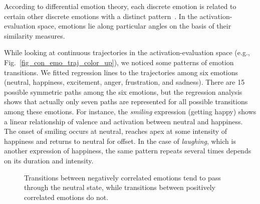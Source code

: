 \documentclass[10pt,journal,cspaper,compsoc]{IEEEtran}
\begin{document}
According to differential emotion theory, each discrete emotion is related to certain other discrete emotions with a distinct pattern~\cite{blumberg1991patterns}. In the activation-evaluation space, emotions lie along particular angles on the basis of their similarity measures.


While looking at  continuous trajectories in the activation-evaluation space (e.g., Fig.~\ref{fig_con_emo_traj_color_up}), we noticed some patterns of emotion transitions. We fitted regression lines to the trajectories among six emotions (neutral, happiness, excitement, anger, frustration, and sadness). There are 15 possible symmetric paths among the six emotions, but the regression analysis shows that actually only seven paths are represented for all possible transitions among these emotions. For instance, the \emph{smiling} expression (getting happy) shows a linear relationship of valence and activation between neutral and happiness. The onset of smiling occurs at neutral, reaches apex at some intensity of happiness and returns to neutral for offset. In the case of \emph{laughing}, which is another expression of happiness, the same pattern repeats several times depends on its duration and intensity.

\begin{figure}[!htp]
\begin{center}
\end{center}
\caption{Transitions between negatively correlated emotions tend to pass through the neutral state, while transitions between positively correlated emotions do not.}
\label{fig_e1_to_e2}
\end{figure}
\end{document}
